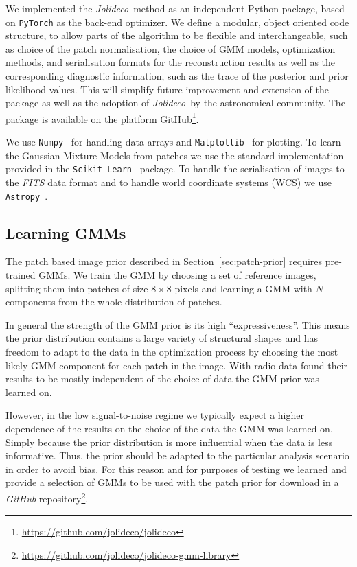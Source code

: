 \documentclass[twocolumn]{aastex631}
\newcommand{\jolideco}{\textit{Jolideco}~}
\begin{document}
    We implemented the \jolideco method as an independent Python package, based on \texttt{PyTorch} as the back-end optimizer.  We define a modular, object oriented code structure, to allow parts of the algorithm to be flexible and interchangeable, such as choice of the patch normalisation, the choice of GMM models, optimization methods, and serialisation formats for the reconstruction results as well as the corresponding diagnostic information, such as the trace of the posterior and prior likelihood values. This will simplify future improvement and extension of the package as well as the adoption of \jolideco by the astronomical community. The package is available on the platform GitHub\footnote{\url{https://github.com/jolideco/jolideco}}.

    We use \texttt{Numpy}~\citep{Numpy2020} for handling data arrays and \texttt{Matplotlib}~\citep{Hunter2007} for plotting. To learn the Gaussian Mixture Models from patches we use the standard implementation provided in the \texttt{Scikit-Learn}~\citep{scikit-learn} package. To handle the serialisation of images to the \textit{FITS} data format and to handle world coordinate systems (WCS) we use \texttt{Astropy}~\citep{Astropy2018}.

    \subsection{Learning GMMs}
    \label{ssec:jolideco-gmm-library}
    The patch based image prior described in Section~\ref{sec:patch-prior} requires pre-trained GMMs. We train the GMM by choosing a set of reference images, splitting them into patches of size $8\times8$ pixels and learning a GMM with $N$-components from the whole distribution of patches. 
    
    In general the strength of the GMM prior is its high \enquote{expressiveness}. This means the prior distribution contains a large variety of structural shapes and has freedom to adapt to the data in the optimization process by choosing the most likely GMM component for each patch in the image. With radio data \cite{Bouman2016} found their results to be mostly independent of the choice of data the GMM prior was learned on. 
    
    However, in the low signal-to-noise regime we typically expect a higher dependence of the results on the choice of the data the GMM was learned on. Simply because the prior distribution is more influential when the data is less informative. Thus, the prior should be adapted to the particular analysis scenario in order to avoid bias. For this reason and for purposes of testing we learned and provide a selection of GMMs to be used with the patch prior for download in a \textit{GitHub} repository\footnote{\url{https://github.com/jolideco/jolideco-gmm-library}}. 
    
\end{document}
